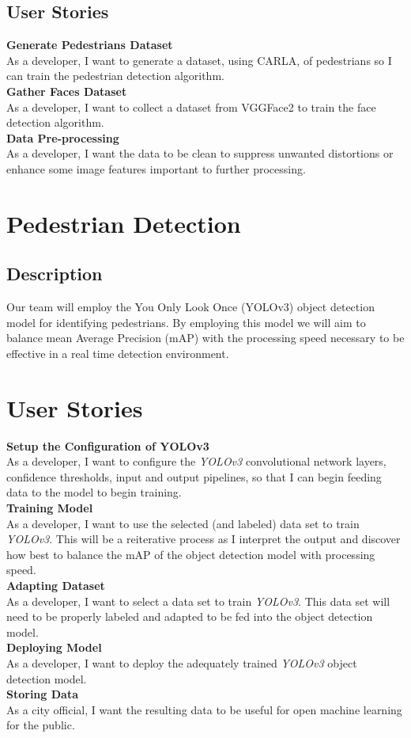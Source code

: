 \subsection{User Stories}

\textbf{Generate Pedestrians Dataset} \\
As a developer, I want to generate a dataset, using CARLA, of pedestrians so I can train the pedestrian detection algorithm.
\\
\textbf{Gather Faces Dataset} \\
As a developer, I want to collect a dataset from VGGFace2 to train the face detection algorithm.
\\
\textbf{Data Pre-processing} \\
As a developer, I want the data to be clean to suppress unwanted distortions or enhance some image features important to further processing.


\section{Pedestrian Detection}

\subsection{Description}

Our team will employ the You Only Look Once (YOLOv3) \cite{YOLOv3} object detection model for identifying pedestrians. By employing this model we will aim to balance mean Average Precision (mAP) with the processing speed necessary to be effective in a real time detection environment.

\section{User Stories}

\textbf{Setup the Configuration of YOLOv3}
\\
As a developer, I want to configure the \textit{YOLOv3} convolutional network layers, confidence thresholds, input and output pipelines, so that I can begin feeding data to the model to begin training.
\\
\textbf{Training Model}
\\
As a developer, I want to use the selected (and labeled) data set to train \textit{YOLOv3}. This will be a reiterative process as I interpret the output and discover how best to balance the mAP of the object detection model with processing speed.
\\
\textbf{Adapting Dataset}
\\
As a developer, I want to select a data set to train \textit{YOLOv3}. This data set will need to be properly labeled and adapted to be fed into the object detection model.
\\
\textbf{Deploying Model}
\\
As a developer, I want to deploy the adequately trained \textit{YOLOv3} object detection model.
\\
\textbf{Storing Data}
\\
As a city official, I want the resulting data to be useful for open machine learning for the public. 


